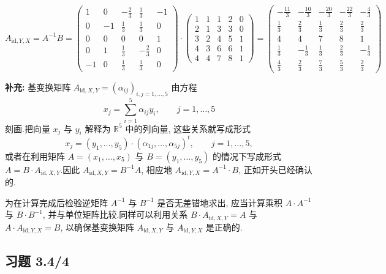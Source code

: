 \[
A_{\mathrm{id}, Y, X} = A^{-1}B = \begin{pmatrix} 1 & 0 & -\frac{2}{3} & \frac{1}{3} & -1 \\ 0 & -1 & \frac{1}{3} & \frac{1}{3} & 0 \\ 0 & 0 & 0 & 0 & 1 \\ 0 & 1 & \frac{1}{3} & -\frac{2}{3} & 0 \\ -1 & 0 & \frac{1}{3} & \frac{1}{3} & 0 \end{pmatrix} \cdot \begin{pmatrix} 1 & 1 & 1 & 2 & 0 \\ 2 & 1 & 3 & 3 & 0 \\ 3 & 2 & 4 & 5 & 1 \\ 4 & 3 & 6 & 6 & 1 \\ 4 & 4 & 7 & 8 & 1 \end{pmatrix} = \begin{pmatrix} -\frac{11}{3} & -\frac{10}{3} & -\frac{20}{3} & -\frac{22}{3} & -\frac{4}{3} \\ \frac{1}{3} & \frac{2}{3} & \frac{1}{3} & \frac{2}{3} & \frac{2}{3} \\ 4 & 4 & 7 & 8 & 1 \\ \frac{1}{3} & -\frac{1}{3} & \frac{1}{3} & \frac{2}{3} & -\frac{1}{3} \\ \frac{4}{3} & \frac{2}{3} & \frac{7}{3} & \frac{5}{3} & \frac{2}{3} \end{pmatrix}
\]

\noindent\textbf{补充:} 基变换矩阵 $A_{\mathrm{id}, X, Y} = (\alpha_{ij})_{i, j = 1, \ldots, 5}$
由方程
\[
x_j = \sum_{i = 1}^{5} \alpha_{ij} y_i, \qquad j = 1, \ldots, 5
\]
刻画.把向量 $x_j$ 与 $y_i$ 解释为 $\mathbb{R}^5$ 中的列向量, 这些关系就写成形式
\[
x_j = (y_1, \ldots, y_5) \cdot (\alpha_{1j}, \ldots, \alpha_{5j})^t, \qquad j = 1, \ldots, 5,
\]
或者在利用矩阵 $A = (x_1, \ldots, x_5)$ 与 $B = (y_1, \ldots, y_5)$ 的情况下写成形式
$A = B \cdot A_{\mathrm{id}, X, Y}$.因此 $A_{\mathrm{id}, X, Y} = B^{-1}A$, 相应地
$A_{\mathrm{id}, Y, X} = A^{-1} \cdot B$, 正如开头已经确认的.

为在计算完成后检验逆矩阵 $A^{-1}$ 与 $B^{-1}$ 是否无差错地求出, 应当计算乘积 $A \cdot A^{-1}$
与 $B \cdot B^{-1}$, 并与单位矩阵比较.同样可以利用关系 $B \cdot A_{\mathrm{id}, X, Y} = A$ 与
$A \cdot A_{\mathrm{id}, Y, X} = B$, 以确保基变换矩阵 $A_{\mathrm{id}, X, Y}$ 与
$A_{\mathrm{id}, Y, X}$ 是正确的.

\subsection*{习题 3.4/4}

